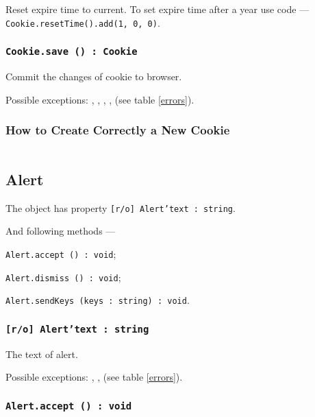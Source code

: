 Reset expire time to current. To set expire time after a year use code — \texttt{Cookie.resetTime().add(1, 0, 0)}.

\subsubsection{\texttt{Cookie.save () : Cookie}}

Commit the changes of cookie to browser.

Possible exceptions: , , , ,  (see table \ref{errors}).

\subsubsection{How to Create Correctly a New Cookie}

\inputminted[linenos]{icl}{../sources/newcookies.icL}


\subsection{{\color{orange} Alert}}

The object \alert{} has property \texttt{[r/o] Alert'text : string}.

And following methods —
\begin{icItems}
	\item \texttt{Alert.accept () : void};
	\item \texttt{Alert.dismiss () : void};
	\item \texttt{Alert.sendKeys (keys : string) : void}.
\end{icItems}

\subsubsection{\texttt{[r/o] Alert'text : string}}

The text of alert.

Possible exceptions: , ,  (see table \ref{errors}).

\subsubsection{\texttt{Alert.accept () : void}}

